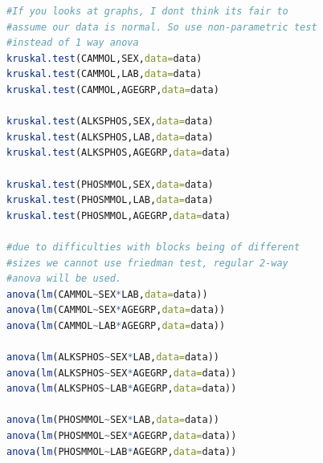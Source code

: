 \documentclass{article}
\begin{document}
{\begin{lstlisting}[language=R]
#If you looks at graphs, I dont think its fair to
#assume our data is normal. So use non-parametric test
#instead of 1 way anova
kruskal.test(CAMMOL,SEX,data=data)
kruskal.test(CAMMOL,LAB,data=data)
kruskal.test(CAMMOL,AGEGRP,data=data)

kruskal.test(ALKSPHOS,SEX,data=data)
kruskal.test(ALKSPHOS,LAB,data=data)
kruskal.test(ALKSPHOS,AGEGRP,data=data)

kruskal.test(PHOSMMOL,SEX,data=data)
kruskal.test(PHOSMMOL,LAB,data=data)
kruskal.test(PHOSMMOL,AGEGRP,data=data)

#due to difficulties with blocks being of different
#sizes we cannot use friedman test, regular 2-way 
#anova will be used.
anova(lm(CAMMOL~SEX*LAB,data=data))
anova(lm(CAMMOL~SEX*AGEGRP,data=data))
anova(lm(CAMMOL~LAB*AGEGRP,data=data))

anova(lm(ALKSPHOS~SEX*LAB,data=data))
anova(lm(ALKSPHOS~SEX*AGEGRP,data=data))
anova(lm(ALKSPHOS~LAB*AGEGRP,data=data))

anova(lm(PHOSMMOL~SEX*LAB,data=data))
anova(lm(PHOSMMOL~SEX*AGEGRP,data=data))
anova(lm(PHOSMMOL~LAB*AGEGRP,data=data))
    \end{lstlisting}}
\end{document}
